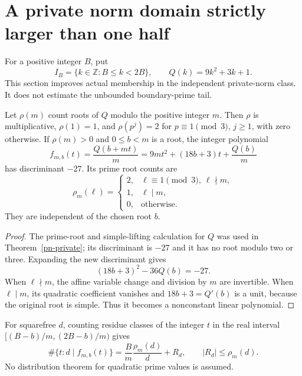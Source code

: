 \section{A private norm domain strictly larger than one half}
\label{pdg-section}

For a positive integer \(B\), put
\[
 I_B=\{k\in\mathbb Z:B\leq k<2B\},\qquad Q(k)=9k^2+3k+1.
\]
This section improves actual membership in the independent
private-norm class. It does not estimate the unbounded boundary-prime
tail.

\begin{lemma}
\label{pdg-cofactor}
Let \(\rho(m)\) count roots of \(Q\) modulo the positive integer \(m\).
Then \(\rho\) is multiplicative, \(\rho(1)=1\), and
\(\rho(p^j)=2\) for \(p\equiv1\pmod3\), \(j\geq1\), with zero
otherwise. If \(\rho(m)>0\) and \(0\leq b<m\) is a root, the
integer polynomial
\[
 f_{m,b}(t)=\frac{Q(b+mt)}m
       =9mt^2+(18b+3)t+\frac{Q(b)}m
\]
has discriminant \(-27\). Its prime root counts are
\[
 \rho_m(\ell)=
 \begin{cases}
  2,&\ell\equiv1\pmod3,\ \ell\nmid m,\\
  1,&\ell\mid m,\\
  0,&\text{otherwise}.
 \end{cases}
\]
They are independent of the chosen root \(b\).
\end{lemma}
\begin{proof}
The prime-root and simple-lifting calculation for \(Q\) was used
in Theorem~\ref{pn-private}; its discriminant is \(-27\) and it has
no root modulo two or three. Expanding the new discriminant gives
\[
 (18b+3)^2-36Q(b)=-27.
\]
When \(\ell\nmid m\), the affine variable change and division by
\(m\) are invertible. When \(\ell\mid m\), its quadratic coefficient
vanishes and \(18b+3=Q'(b)\) is a unit, because the original root is
simple. Thus it becomes a nonconstant linear polynomial.
\end{proof}

For squarefree \(d\), counting residue classes of the integer \(t\)
in the real interval
\([ (B-b)/m,(2B-b)/m )\) gives
\begin{equation}\label{pdg-remainder}
 \#\{t:d\mid f_{m,b}(t)\}
   =\frac Bm\frac{\rho_m(d)}d+R_d,\qquad |R_d|\leq\rho_m(d).
\end{equation}
No distribution theorem for quadratic prime values is assumed.

